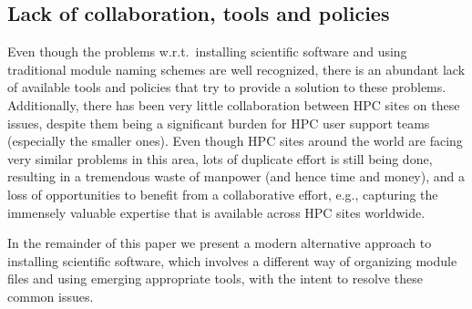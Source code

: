 
\subsection{Lack of collaboration, tools and policies}
\label{sec:traditional_lack}

Even though the problems w.r.t.\ installing scientific software and using
traditional module naming schemes are well recognized, there is an abundant lack
of available tools and policies that try to provide a solution to these problems.
Additionally, there has been very little collaboration between HPC sites on these
issues, despite them being a significant burden for HPC user support teams
(especially the smaller ones). Even though HPC sites around the world are facing
very similar problems in this area, lots of duplicate effort is still being done,
resulting in a tremendous waste of manpower (and hence time and money), and a loss
of opportunities to benefit from a collaborative effort, e.g., capturing the
immensely valuable expertise that is available across HPC sites worldwide.

In the remainder of this paper we present a modern alternative approach to
installing scientific software, which involves a different way of organizing
module files and using emerging appropriate tools, with the intent to resolve
these common issues.


